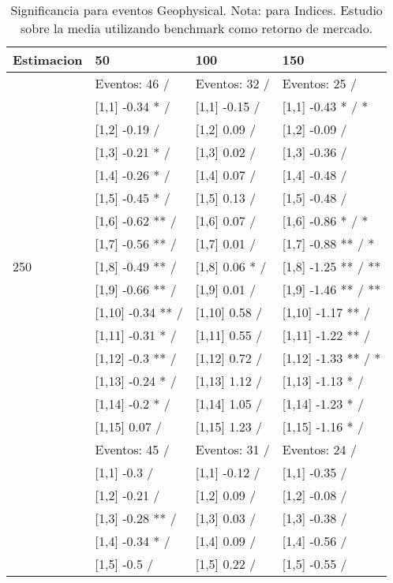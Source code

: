 \begin{table}

\caption{Significancia para eventos Geophysical. Nota: para Indices. Estudio sobre la media utilizando benchmark como retorno de mercado.}
\centering
\begin{tabular}[t]{llll}
\toprule
Estimacion & 50 & 100 & 150\\
\midrule
 & Eventos:  46 / & Eventos:  32 / & Eventos:  25 /\\
 & {}[1,1] -0.34 * / & {}[1,1] -0.15  / & {}[1,1] -0.43 * / *\\
 & {}[1,2] -0.19  / & {}[1,2] 0.09  / & {}[1,2] -0.09  /\\
 & {}[1,3] -0.21 * / & {}[1,3] 0.02  / & {}[1,3] -0.36  /\\
 & {}[1,4] -0.26 * / & {}[1,4] 0.07  / & {}[1,4] -0.48  /\\
\addlinespace
 & {}[1,5] -0.45 * / & {}[1,5] 0.13  / & {}[1,5] -0.48  /\\
 & {}[1,6] -0.62 ** / & {}[1,6] 0.07  / & {}[1,6] -0.86 * / *\\
 & {}[1,7] -0.56 ** / & {}[1,7] 0.01  / & {}[1,7] -0.88 ** / *\\
250 & {}[1,8] -0.49 ** / & {}[1,8] 0.06 * / & {}[1,8] -1.25 ** / **\\
 & {}[1,9] -0.66 ** / & {}[1,9] 0.01  / & {}[1,9] -1.46 ** / **\\
\addlinespace
 & {}[1,10] -0.34 ** / & {}[1,10] 0.58  / & {}[1,10] -1.17 ** /\\
 & {}[1,11] -0.31 * / & {}[1,11] 0.55  / & {}[1,11] -1.22 ** /\\
 & {}[1,12] -0.3 ** / & {}[1,12] 0.72  / & {}[1,12] -1.33 ** / *\\
 & {}[1,13] -0.24 * / & {}[1,13] 1.12  / & {}[1,13] -1.13 * /\\
 & {}[1,14] -0.2 * / & {}[1,14] 1.05  / & {}[1,14] -1.23 * /\\
\addlinespace
 & {}[1,15] 0.07  / & {}[1,15] 1.23  / & {}[1,15] -1.16 * /\\
 & Eventos:  45 / & Eventos:  31 / & Eventos:  24 /\\
 & {}[1,1] -0.3  / & {}[1,1] -0.12  / & {}[1,1] -0.35  /\\
 & {}[1,2] -0.21  / & {}[1,2] 0.09  / & {}[1,2] -0.08  /\\
 & {}[1,3] -0.28 ** / & {}[1,3] 0.03  / & {}[1,3] -0.38  /\\
\addlinespace
 & {}[1,4] -0.34 * / & {}[1,4] 0.09  / & {}[1,4] -0.56  /\\
 & {}[1,5] -0.5  / & {}[1,5] 0.22  / & {}[1,5] -0.55  /\\

\end{tabular}
\end{table}
